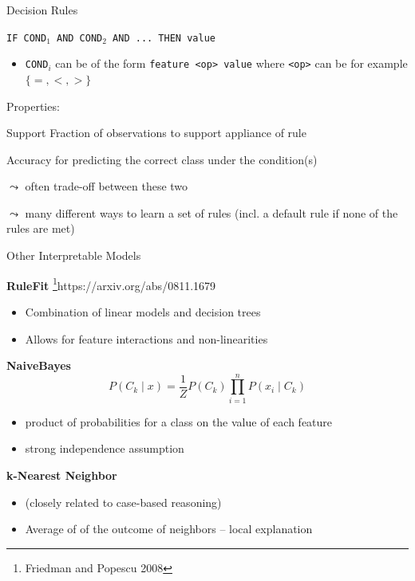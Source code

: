 \documentclass[11pt,compress,t,notes=noshow, xcolor=table]{beamer}
\begin{document}

\begin{vbframe}{Decision Rules}

\texttt{IF COND$_1$ AND COND$_2$ AND ... THEN value}

\begin{itemize}
    \item \texttt{COND$_i$} can be of the form \texttt{feature <op> value} where \texttt{<op>} can be for example $\{=, <, > \}$
\end{itemize}


\medskip

Properties:
\begin{description}
    \item{Support} Fraction of observations to support appliance of rule
    \item{Accuracy} for predicting the correct class under the condition(s)
\end{description}

$\leadsto$ often trade-off between these two


\medskip

$\leadsto$ many different ways to learn a set of rules (incl. a default rule if none of the rules are met)

\end{vbframe}



\begin{vbframe}{Other Interpretable Models}

\textbf{RuleFit} \footnote{Friedman and Popescu 2008}{https://arxiv.org/abs/0811.1679}
\begin{itemize}
    \item Combination of linear models and decision trees 
    \item Allows for feature interactions and non-linearities
\end{itemize}

\textbf{NaiveBayes}
$$P (C_k \mid x ) = \frac{1}{Z} P(C_k) \prod_{i=1}^{n} P(x_i \mid C_k) $$
\begin{itemize}
    \item product of probabilities for a class on the value of each feature
    \item strong independence assumption
\end{itemize}


\textbf{k-Nearest Neighbor}
\begin{itemize}
    \item (closely related to case-based reasoning)
    \item Average of of the outcome of neighbors -- local explanation
\end{itemize}

\end{vbframe}
\end{document}
